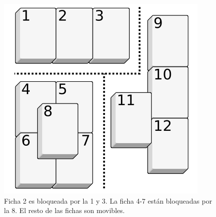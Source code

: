 \documentclass{sig-alternate}
\begin{document}
\onecolumn

\begin{figure}[h!]
  \begin{center}
  	\includegraphics[scale=0.3]{images/blocking.png}
  \end{center}
  \caption{Ficha 2 es bloqueada por la 1 y 3. La ficha 4-7 est\'an bloqueadas por la 8. El resto de las fichas son movibles.}
  \label{fig:blocking}
\end{figure}
\end{document}
